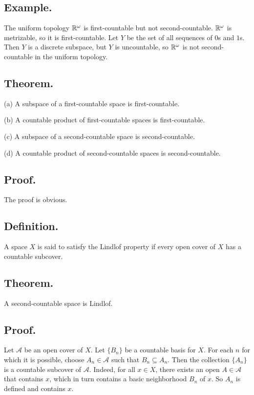 \documentclass[titlepage]{article}
\begin{document}
\subsection{Example.} The uniform topology $\mathbb{R}^{\omega}$ is first-countable but not second-countable. $\mathbb{R}^{\omega}$ is metrizable, so it is first-countable. Let $Y$ be the set of all sequences of $0$s and $1$s. Then $Y$ is a discrete subspace, but $Y$ is uncountable, so $\mathbb{R}^{\omega}$ is not second-countable in the uniform topology.

\subsection{Theorem.} 

(a) A subspace of a first-countable space is first-countable.

(b) A countable product of first-countable spaces is first-countable.

(c) A subspace of a second-countable space is second-countable.

(d) A countable product of second-countable spaces is second-countable.

\subsection{Proof.} The proof is obvious.

\subsection{Definition.} A space $X$ is said to satisfy the Lindlof property if every open cover of $X$ has a countable subcover.

\subsection{Theorem.} A second-countable space is Lindlof.

\subsection{Proof.} Let $\mathcal{A}$ be an open cover of $X$. Let $\{B_{n}\}$ be a countable basis for $X$. For each $n$ for which it is possible, choose $A_{n} \in \mathcal{A}$ such that $B_{n} \subseteq A_{n}$. Then the collection $\{A_{n}\}$ is a countable subcover of $\mathcal{A}$. Indeed, for all $x \in X$, there exists an open $A \in \mathcal{A}$ that contains $x$, which in turn contains a basic neighborhood $B_{n}$ of $x$. So $A_{n}$ is defined and contains $x$.
\end{document}
